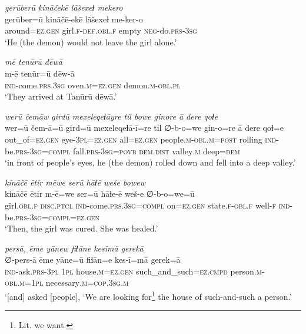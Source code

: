 \ea \label{ZP.76}
\textit{gerūberū kināčekē lāšexeɫ mekero} \\ 
\gll gerūber=ū kināčē-ekē lāšexeɫ me-ker-o \\ 
 around\textsc{\textsc{=ez.gen}} girl\textsc{.f}\textsc{-def}\textsc{.obl}\textsc{.f} empty \textsc{neg-}do\textsc{.prs}\textsc{-3sg} \\ 
\glt `He (the demon) would not leave the girl alone.'
\z 
 
\ea \label{ZP.77}
\textit{mē tenūrū dēwā} \\ 
\gll m-ē tenūr=ū dēw-ā \\ 
 \textsc{ind-}come\textsc{.prs}\textsc{.3sg} oven\textsc{.m}\textsc{\textsc{=ez.gen}} demon\textsc{.m}\textsc{-obl}\textsc{.pl} \\ 
\glt `They arrived at Tanūrū dēwā.'
\z 
 
\ea \label{ZP.80}
\textit{werū čemāw girdū mexeleqeɫāyre til bowe ginore ā dere qoɫe} \\ 
\gll wer=ū čem-ā=ū gird=ū mexeleqeɫā-ī=re til ∅-b-o=we gin-o=re ā dere qoɫ=e \\ 
 out\_of\textsc{\textsc{=ez.gen}} eye\textsc{-3pl}\textsc{\textsc{=ez.gen}} all\textsc{\textsc{=ez.gen}} people\textsc{.m}\textsc{-obl}\textsc{.m}\textsc{=\textsc{post}} rolling \textsc{ind-}be\textsc{.prs}\textsc{-3sg}\textsc{=compl} fall\textsc{.prs}\textsc{-3sg}\textsc{=\textsc{povb}} \textsc{dem.dist} valley\textsc{.m} deep\textsc{=dem} \\ 
\glt `in front of people’s eyes, he (the demon) rolled down and fell into a deep valley.'
\z 
 
\ea \label{ZP.82}
\textit{kināčē ētir mēwe serū hāɫē weše bowew} \\ 
\gll kināčē ētir m-ē=we ser=ū hāɫe-ē weš-e ∅-b-o=we=ū \\ 
 girl\textsc{.obl}\textsc{.f} \textsc{disc.ptcl} \textsc{ind-}come\textsc{.prs}\textsc{.3sg}\textsc{=compl} on\textsc{\textsc{=ez.gen}} state\textsc{.f}\textsc{-obl}\textsc{.f} well\textsc{-f} \textsc{ind-}be\textsc{.prs}\textsc{-3sg}\textsc{=compl}\textsc{\textsc{=ez.gen}} \\ 
\glt `Then, the girl was cured. She was healed.'
\z 
 
\ea \label{ZP.84}
\textit{persā, ēme yānew fiɫāne kesīmā gerekā} \\ 
\gll ∅-pers-ā ēme yāne=ū fiɫān=e kes-ī=mā gerek=ā \\ 
 \textsc{ind-}ask\textsc{.prs}\textsc{-3pl} \textsc{1pl} house\textsc{.m}\textsc{\textsc{=ez.gen}} such\_and\_such\textsc{=ez}\textsc{.cmpd} person\textsc{.m}\textsc{-obl}\textsc{.m}\textsc{=1pl} necessary\textsc{.m}\textsc{=cop}\textsc{.3sg}\textsc{.m} \\ 
\glt `[and] asked [people], ‘We are looking for\footnote{Lit. we want.} the house of such-and-such a person.'
\z 
 
